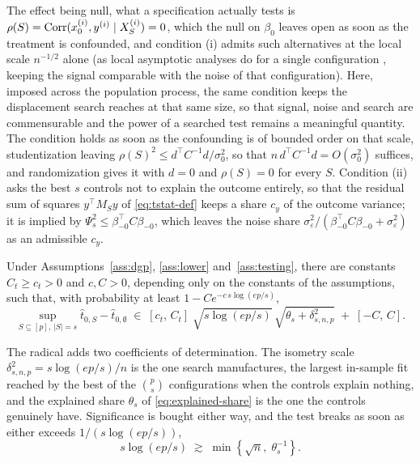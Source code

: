 The effect being null, what a specification actually tests is
$\rho(S) = \operatorname{Corr}(x_0^{(i)}, y^{(i)} \mid X_S^{(i)}) = 0$, which the null
on $\beta_0$ leaves open as soon as the treatment is confounded, and
condition (i) admits such alternatives at the local scale $n^{-1/2}$
alone (as local asymptotic analyses do for a single configuration
\citep{vaart1998asymptotic}, keeping the signal comparable with the noise
of that configuration). Here, imposed across the population process, the
same condition keeps the displacement search reaches at that same size,
so that signal, noise and search are commensurable and the power of a
searched test remains a meaningful quantity. The condition holds as soon
as the confounding is of bounded order on that scale, studentization
leaving $\rho(S)^2 \le d^\top C^{-1} d / \sigma_0^2$, so that
$n\, d^\top C^{-1} d = O(\sigma_0^2)$ suffices, and randomization gives
it with $d = 0$ and $\rho(S) = 0$ for every $S$. Condition (ii) asks the
best $s$ controls not to explain the outcome entirely, so that the
residual sum of squares $y^\top M_S y$ of \eqref{eq:tstat-def} keeps a
share $c_y$ of the outcome variance; it is implied by
$\Psi_s^2 \le \beta_{-0}^\top C \beta_{-0}$, which leaves the noise share
$\sigma_\varepsilon^2 / (\beta_{-0}^\top C \beta_{-0}
+ \sigma_\varepsilon^2)$ as an admissible $c_y$.

\begin{theorem}\label{thm:tstat}
Under Assumptions~\ref{ass:dgp}, \ref{ass:lower}
and~\ref{ass:testing}, there are constants $C_t \ge c_t > 0$ and
$c, C > 0$, depending only on the constants of the assumptions, such
that, with probability at least $1 - C e^{-c\, s \log(ep/s)}$,
\begin{equation}\label{eq:tstat-rate}
        \sup_{S \subseteq [p],\, |S| = s} \hat t_{0,S}
        - \hat t_{0,\emptyset}
        \;\in\;
        [c_t,\, C_t]\;
        \sqrt{ s \log(ep/s) }\,
        \sqrt{ \theta_s + \delta_{s,n,p}^2 }
        \;+\; [-C,\, C] .
\end{equation}
\end{theorem}

The radical adds two coefficients of determination. The isometry
scale $\delta_{s,n,p}^2 = s\log(ep/s)/n$ is the one search manufactures,
the largest in-sample fit reached by the best of the $\binom{p}{s}$
configurations when the controls explain nothing, and the explained share
$\theta_s$ of \eqref{eq:explained-share} is the one the controls
genuinely have. Significance is bought either way, and the test breaks as
soon as either exceeds $1/(s\log(ep/s))$,
\begin{equation*}
        s \log(ep/s)
        \;\gtrsim\;
        \min\left\{ \sqrt n,\; \theta_s^{-1} \right\} .
\end{equation*}

